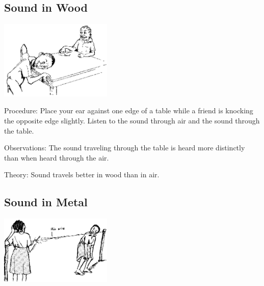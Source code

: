 \begin{multicols}{2}
\subsection{Sound in Wood}

\begin{center}
\includegraphics[width=0.4\textwidth]{./img/source/sound-in-wood.png}
\end{center}

\begin{description*}
\item[Procedure:]{Place your ear against one edge of a table while a friend is knocking the opposite edge slightly. Listen to the sound through air and the sound through the table.}
\item[Observations:]{The sound traveling through the table is heard more distinctly than when heard through the air.}
\item[Theory:]{Sound travels better in wood than in air.}
\end{description*}

\subsection{Sound in Metal}

\begin{center}
\includegraphics[width=0.4\textwidth]{./img/source/sound-in-metal.png}
\end{center}


\end{multicols}
